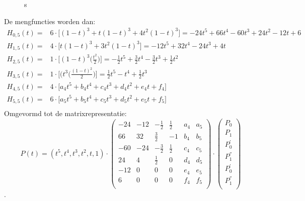 \documentclass{report}
\begin{document}
\begin{itemize}
\begin{figure}[ht]
			\caption{s}
			\label{fig:20invtriangular}
		\end{figure}
		
		De mengfuncties worden dan:
		\begin{equation*}
			\begin{split}
				H_{0, 5}(t) = & 6 \cdot \bigg[(1-t)^3 + t(1-t)^3 + 4t^2(1-t)^3\bigg] = -24t^5 + 66t^4 -60t^3 + 24t^2 -12t + 6\\
				H_{1, 5}(t) = & 4 \cdot \bigg[t(1-t)^3 + 3t^2(1-t)^3\bigg] = -12t^5 +32t^4 -24t^3 + 4t\\
				H_{2, 5}(t) = & 1 \cdot \bigg[(1 - t)^3\bigg(\frac{t^2}{2}\bigg)\bigg] = -\frac{1}{2}  t^5 + \frac{3}{2}  t^4  - \frac{3}{2}t^3 + \frac{1}{2}t^2\\
				H_{3, 5}(t) = & 1 \cdot \bigg[(t^3\bigg(\frac{(1-t)^2}{2}\bigg)\bigg] = \frac{1}{2}t^5 - t^4 + \frac{1}{2}t^3\\
				H_{4, 5}(t) = & 4 \cdot \bigg[a_4t^5 + b_4t^4 + c_4t^3 + d_4t^2 + e_4t + f_4 \bigg]  \\
				H_{5, 5}(t) = & 6 \cdot \bigg[a_5t^5 + b_5t^4 + c_5t^3 + d_5t^2 + e_5t + f_5 \bigg]  \\
			\end{split}
		\end{equation*}
		Omgevormd tot de matrixrepresentatie:
		$$
		P(t) = (t^5, t^4, t^3, t^2, t, 1) 
		\cdot
		\begin{pmatrix}
			-24 & -12 & - \frac{1}{2}  & \frac{1}{2} & a_4 & a_5 \\
			66  & 32  & \frac{3}{2}    & -1 		 & b_4 & b_5 \\
			-60 & -24 & - \frac{3}{2}  & \frac{1}{2} & c_4 & c_5 \\
			24  & 4   &  \frac{1}{2}   & 0 			 & d_4 & d_5 \\
			-12 & 0   & 0  			   & 0 			 & e_4 & e_5 \\
			6   & 0   & 0  			   & 0 			 & f_4 & f_5 \\
		\end{pmatrix}
		\cdot 
		\begin{pmatrix}
			P_0 \\
			P_1 \\
			P_0^{'} \\
			P_1^{''} \\
			P_0^{'} \\
			P_1^{''} \\

		\end{pmatrix}
		$$
		.



			
\end{itemize}
\end{document}
